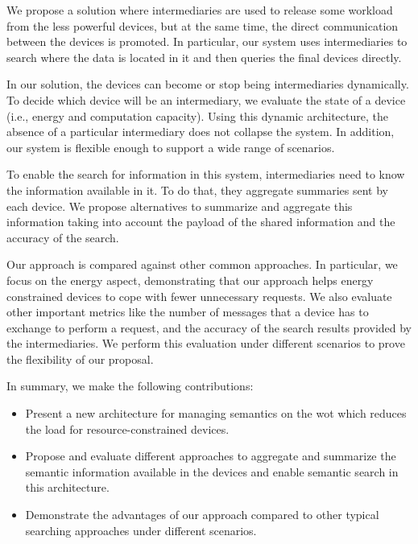 We propose a solution where intermediaries are used to release some workload from the less powerful devices, but at the same time, the direct communication between the devices is promoted.
In particular, our system uses intermediaries to search where the data is located in it and then queries the final devices directly. %

In our solution, the devices can become or stop being intermediaries dynamically.
To decide which device will be an intermediary, we evaluate the state of a device (i.e., energy and computation capacity).
Using this dynamic architecture, the absence of a particular intermediary does not collapse the system.
In addition, our system is flexible enough to support a wide range of scenarios.

To enable the search for information in this system, intermediaries need to know the information available in it.
To do that, they aggregate summaries sent by each device.
We propose alternatives to summarize and aggregate this information taking into account the payload of the shared information and the accuracy of the search.

Our approach is compared against other common approaches.
In particular, we focus on the energy aspect, demonstrating that our approach helps energy constrained devices to cope with fewer unnecessary requests.
We also evaluate other important metrics like the number of messages that a device has to exchange to perform a request, and the accuracy of the search results provided by the intermediaries.
We perform this evaluation under different scenarios to prove the flexibility of our proposal.

In summary, we make the following contributions:
\begin{itemize}
\item Present a new architecture for managing semantics on the \ac{wot} which reduces the load for resource-constrained devices.
\item Propose and evaluate different approaches to aggregate and summarize the semantic information available in the devices and enable semantic search in this architecture.
\item Demonstrate the advantages of our approach compared to other typical searching approaches under different scenarios.
\end{itemize}

